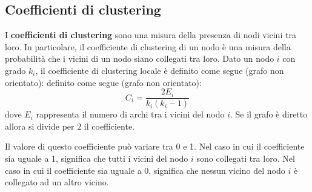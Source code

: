 \subsection{Coefficienti di clustering}
\begin{definizione}
    I \textbf{coefficienti di clustering} sono una misura della presenza di nodi
    vicini tra loro. In particolare, il coefficiente di clustering di un nodo è una
    misura della probabilità che i vicini di un nodo siano collegati tra loro.
    Dato un nodo $i$ con grado $k_i$, il coefficiente di clustering locale è
    definito come segue (grafo non orientato):
    definito come segue (grafo non orientato):
    \begin{equation}
        C_i = \frac{2E_i}{k_i(k_i - 1)}
    \end{equation}
    dove $E_i$ rappresenta il numero di archi tra i vicini del nodo $i$. Se il grafo
    è diretto allora si divide per $2$ il coefficiente.
\end{definizione}

Il valore di questo coefficiente può variare tra 0 e 1. Nel caso in cui il
coefficiente sia uguale a 1, significa che tutti i vicini del nodo $i$ sono
collegati tra loro. Nel caso in cui il coefficiente sia uguale a 0, significa
che nessun vicino del nodo $i$ è collegato ad un altro vicino.

